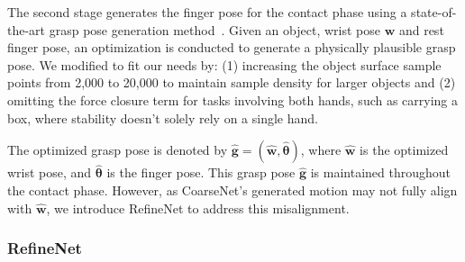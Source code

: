 The second stage generates the finger pose for the contact phase using a state-of-the-art grasp pose generation method~\cite{wang2023dexgraspnet}.
Given an object, wrist pose $\bm{w}$ and rest finger pose, an optimization is conducted to generate a physically plausible grasp pose.  
We modified \cite{wang2023dexgraspnet} to fit our needs by: (1) increasing the object surface sample points from 2,000 to 20,000 to maintain sample density for larger objects and (2) omitting the force closure term for tasks involving both hands, such as carrying a box, where stability doesn’t solely rely on a single hand.

The optimized grasp pose is denoted by $\hat{\bm{g}} = (\hat{\bm{w}}, {\hat{\bm{\theta}}})$, where $\hat{\bm{w}}$ is the optimized wrist pose, and $\hat{\bm{\theta}}$ is the finger pose. This grasp pose $\hat{\bm{g}}$ is maintained throughout the contact phase. However, as CoarseNet’s generated motion may not fully align with $\hat{\bm{w}}$, we introduce RefineNet to address this misalignment.

\subsubsection{RefineNet}
\label{sec:refine_net}

